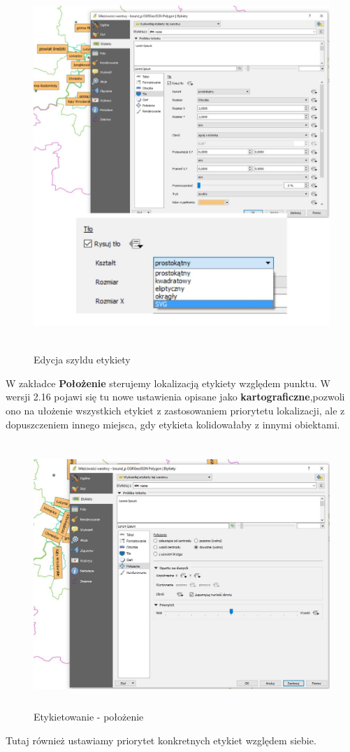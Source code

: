 \documentclass[12pt,a4paper]{book}
\begin{document}
\begin{center}
\begin{figure}
\includegraphics[width=13cm,height=13.988cm]{007-etykiety-szyld.jpg}
\caption{Edycja szyldu etykiety}
\end{figure}
\end{center}
W zakładce \textbf{Położenie }sterujemy lokalizacją etykiety względem punktu. W wersji 2.16 pojawi się tu nowe ustawienia opisane jako \textbf{kartograficzne},pozwoli ono na ułożenie wszystkich etykiet z zastosowaniem priorytetu lokalizacji, ale z dopuszczeniem innego miejsca, gdy etykieta kolidowałaby z innymi obiektami.


\begin{center}
\begin{figure}
\includegraphics[width=13cm,height=10.061cm]{007-etykiety-polozenie.jpg}
\caption{Etykietowanie - położenie}
\end{figure}
\end{center}
Tutaj również ustawiamy priorytet konkretnych etykiet względem siebie.
\end{document}
